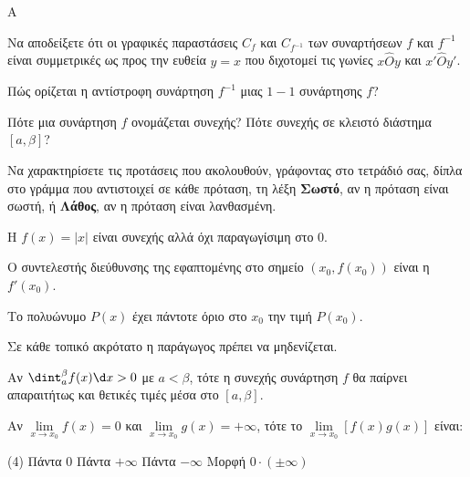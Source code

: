 \begin{thema}{A}
\begin{erwthma}
    \item Να αποδείξετε ότι οι γραφικές παραστάσεις $ C_f $ και $ C_{f^{-1}} $ των συναρτήσεων $ f $ και $ f^{-1} $ είναι συμμετρικές ως προς την ευθεία $ y=x $ που διχοτομεί τις γωνίες $ x\hat{O}y $ και $ x'\hat{O}y' $.
    \item Πώς ορίζεται η αντίστροφη συνάρτηση $f^{-1}$ μιας $1-1$ συνάρτησης $f$?
    \item Πότε μια συνάρτηση $f$ ονομάζεται συνεχής? Πότε συνεχής σε κλειστό διάστημα $[a, \beta]$?
    \item Να χαρακτηρίσετε τις προτάσεις που ακολουθούν, γράφοντας στο τετράδιό σας, δίπλα στο γράμμα που αντιστοιχεί σε κάθε πρόταση, τη λέξη \textbf{Σωστό}, αν η πρόταση είναι σωστή, ή \textbf{Λάθος}, αν η πρόταση είναι λανθασμένη.
    \begin{alist}
        \item H $f(x)=|x|$ είναι συνεχής αλλά όχι παραγωγίσιμη στο 0.
        \item Ο συντελεστής διεύθυνσης της εφαπτομένης στο σημείο $(x_0, f(x_0))$ είναι η $f'(x_0)$.
        \item Το πολυώνυμο $P(x)$ έχει πάντοτε όριο στο $x_0$ την τιμή $P(x_0)$.
        \item Σε κάθε τοπικό ακρότατο η παράγωγος πρέπει να μηδενίζεται.
        \item Αν $\dint_{a}^{\beta} f(x) \d x > 0$ με $a < \beta$, τότε η συνεχής συνάρτηση $f$ θα παίρνει απαραιτήτως και θετικές τιμές μέσα στο $[a, \beta]$.
    \end{alist}
    \item Αν $\lim\limits_{x\to x_0} f(x) = 0$ και $\lim\limits_{x\to x_0} g(x) = +\infty$, τότε το $\lim\limits_{x\to x_0} [f(x)g(x)]$ είναι:
    \begin{tasks}[label=\let\textdexiakeraia\relax\alph*.](4)
        \task Πάντα $0$
        \task Πάντα $+\infty$
        \task Πάντα $-\infty$
        \task Μορφή $0 \cdot (\pm \infty)$
    \end{tasks}
\end{erwthma}
\end{thema}


